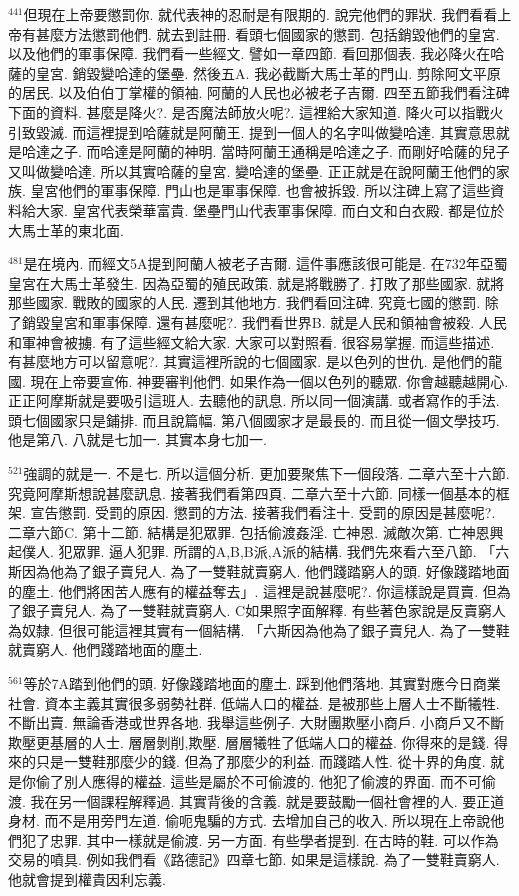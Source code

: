 \documentclass{book}
\begin{document}
$^{441}$但現在上帝要懲罰你.
就代表神的忍耐是有限期的.
說完他們的罪狀.
我們看看上帝有甚麼方法懲罰他們.
就去到註冊.
看頭七個國家的懲罰.
包括銷毀他們的皇宮.
以及他們的軍事保障.
我們看一些經文.
譬如一章四節.
看回那個表.
我必降火在哈薩的皇宮.
銷毀變哈達的堡壘.
然後五A.
我必截斷大馬士革的門山.
剪除阿文平原的居民.
以及伯伯丁掌權的領袖.
阿蘭的人民也必被老子吉爾.
四至五節我們看注碑下面的資料.
甚麼是降火?.
是否魔法師放火呢?.
這裡給大家知道.
降火可以指戰火引致毀滅.
而這裡提到哈薩就是阿蘭王.
提到一個人的名字叫做變哈達.
其實意思就是哈達之子.
而哈達是阿蘭的神明.
當時阿蘭王通稱是哈達之子.
而剛好哈薩的兒子又叫做變哈達.
所以其實哈薩的皇宮.
變哈達的堡壘.
正正就是在說阿蘭王他們的家族.
皇宮他們的軍事保障.
門山也是軍事保障.
也會被拆毀.
所以注碑上寫了這些資料給大家.
皇宮代表榮華富貴.
堡壘門山代表軍事保障.
而白文和白衣殿.
都是位於大馬士革的東北面.

$^{481}$是在境內.
而經文5A提到阿蘭人被老子吉爾.
這件事應該很可能是.
在732年亞蜀皇宮在大馬士革發生.
因為亞蜀的殖民政策.
就是將戰勝了.
打敗了那些國家.
就將那些國家.
戰敗的國家的人民.
遷到其他地方.
我們看回注碑.
究竟七國的懲罰.
除了銷毀皇宮和軍事保障.
還有甚麼呢?.
我們看世界B.
就是人民和領袖會被殺.
人民和軍神會被擄.
有了這些經文給大家.
大家可以對照看.
很容易掌握.
而這些描述.
有甚麼地方可以留意呢?.
其實這裡所說的七個國家.
是以色列的世仇.
是他們的龍國.
現在上帝要宣佈.
神要審判他們.
如果作為一個以色列的聽眾.
你會越聽越開心.
正正阿摩斯就是要吸引這班人.
去聽他的訊息.
所以同一個演講.
或者寫作的手法.
頭七個國家只是鋪排.
而且說篇幅.
第八個國家才是最長的.
而且從一個文學技巧.
他是第八.
八就是七加一.
其實本身七加一.

$^{521}$強調的就是一.
不是七.
所以這個分析.
更加要聚焦下一個段落.
二章六至十六節.
究竟阿摩斯想說甚麼訊息.
接著我們看第四頁.
二章六至十六節.
同樣一個基本的框架.
宣告懲罰.
受罰的原因.
懲罰的方法.
接著我們看注十.
受罰的原因是甚麼呢?.
二章六節C.
第十二節.
結構是犯眾罪.
包括偷渡姦淫.
亡神恩.
滅敵次第.
亡神恩興起僕人.
犯眾罪.
逼人犯罪.
所謂的A,B,B派,A派的結構.
我們先來看六至八節.
「六斯因為他為了銀子賣兒人.
為了一雙鞋就賣窮人.
他們踐踏窮人的頭.
好像踐踏地面的塵土.
他們將困苦人應有的權益奪去」.
這裡是說甚麼呢?.
你這樣說是買賣.
但為了銀子賣兒人.
為了一雙鞋就賣窮人.
C如果照字面解釋.
有些著色家說是反賣窮人為奴隸.
但很可能這裡其實有一個結構.
「六斯因為他為了銀子賣兒人.
為了一雙鞋就賣窮人.
他們踐踏地面的塵土.

$^{561}$等於7A踏到他們的頭.
好像踐踏地面的塵土.
踩到他們落地.
其實對應今日商業社會.
資本主義其實很多弱勢社群.
低端人口的權益.
是被那些上層人士不斷犧牲.
不斷出賣.
無論香港或世界各地.
我舉這些例子.
大財團欺壓小商戶.
小商戶又不斷欺壓更基層的人士.
層層剝削,欺壓.
層層犧牲了低端人口的權益.
你得來的是錢.
得來的只是一雙鞋那麼少的錢.
但為了那麼少的利益.
而踐踏人性.
從十界的角度.
就是你偷了別人應得的權益.
這些是屬於不可偷渡的.
他犯了偷渡的界面.
而不可偷渡.
我在另一個課程解釋過.
其實背後的含義.
就是要鼓勵一個社會裡的人.
要正道身材.
而不是用旁門左道.
偷呃鬼騙的方式.
去增加自己的收入.
所以現在上帝說他們犯了忠罪.
其中一樣就是偷渡.
另一方面.
有些學者提到.
在古時的鞋.
可以作為交易的噴具.
例如我們看《路德記》四章七節.
如果是這樣說.
為了一雙鞋賣窮人.
他就會提到權貴因利忘義.
\end{document}

